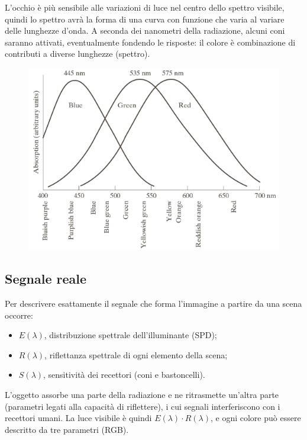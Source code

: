 L'occhio è più sensibile alle variazioni di luce nel centro dello spettro visibile, quindi lo spettro avrà la forma di una curva con funzione che varia al variare delle lunghezze d'onda. A seconda dei nanometri della radiazione, alcuni coni saranno attivati, eventualmente fondendo le risposte: il colore è combinazione di contributi a diverse lunghezze (spettro).

\begin{figure}[h]
	\centering
	\includegraphics[scale=0.6]{Lezioni/Immagini/coni}
\end{figure}

\subsection{Segnale reale}
Per descrivere esattamente il segnale che forma l'immagine a partire da una scena occorre:
\begin{itemize}
	\item $E(\lambda)$, distribuzione spettrale dell'illuminante (SPD);
	\item $R(\lambda)$, riflettanza spettrale di ogni elemento della scena;
	\item $S(\lambda)$, sensitività dei recettori (coni e bastoncelli).
\end{itemize}

L'oggetto assorbe una parte della radiazione e ne ritrasmette un'altra parte (parametri legati alla capacità di riflettere), i cui segnali interferiscono con i recettori umani. La luce visibile è quindi $E(\lambda) \cdot R(\lambda)$, e ogni colore può essere descritto da tre parametri (RGB).

